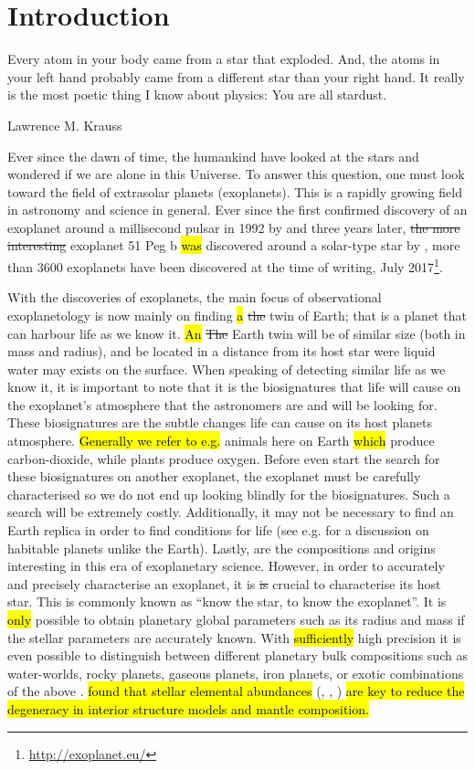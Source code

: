 \chapter{Introduction}
\label{cha:introduction}
\epigraph{Every atom in your body came from a star that exploded. And, the atoms in your left hand
          probably came from a different star than your right hand. It really is the most poetic
          thing I know about physics: You are all stardust.}{Lawrence M. Krauss}

Ever since the dawn of time, the humankind have looked at the stars and wondered if we are alone in
this Universe. To answer this question, one must look toward the field of extrasolar planets
(exoplanets). This is a rapidly growing field in astronomy and science in general. Ever since the
first confirmed discovery of an exoplanet around a millisecond pulsar in 1992 by
\citet{Wolszczan1992} and three years later, \st{the more interesting} exoplanet 51 Peg b \hl{was}
discovered around a solar-type star by \citet{Mayor1995}, more than 3600 exoplanets have been
discovered at the time of writing, July 2017\footnote{\url{http://exoplanet.eu/}}.

With the discoveries of exoplanets, the main focus of observational exoplanetology is now mainly on
finding \hl{a} \st{the} twin of Earth; that is a planet that can harbour life as we know it. \hl{An}
\st{The} Earth twin will be of similar size (both in mass and radius), and be located in a distance
from its host star were liquid water may exists on the surface. When speaking of detecting similar
life as we know it, it is important to note that it is the biosignatures that life will cause on the
exoplanet's atmosphere that the astronomers are and will be looking for. These biosignatures are the
subtle changes life can cause on its host planets atmosphere. \hl{Generally we refer to e.g.}
animals here on Earth \hl{which} produce carbon-dioxide, while plants produce oxygen. Before even
start the search for these biosignatures on another exoplanet, the exoplanet must be carefully
characterised so we do not end up looking blindly for the biosignatures. Such a search will be
extremely costly. Additionally, it may not be necessary to find an Earth replica in order to find
conditions for life (see e.g. \citet{Alibert2014} for a discussion on habitable planets unlike the
Earth). Lastly, are the compositions and origins interesting in this era of exoplanetary science.
However, in order to accurately and precisely characterise an exoplanet, it is \st{is} crucial to
characterise its host star. This is commonly known as ``know the star, to know the exoplanet''. It
is \hl{only} possible to obtain planetary global parameters such as its radius and mass if the
stellar parameters are accurately known. With \hl{sufficiently} high precision it is even possible
to distinguish between different planetary bulk compositions such as water-worlds, rocky planets,
gaseous planets, iron planets, or exotic combinations of the above
\citep[e.g.][]{Thiabaud2014,Dorn2015}. \citet{Dorn2015} \hl{found that stellar elemental abundances}
(, , ) \hl{are key to reduce the degeneracy in interior structure models and
mantle composition.}

